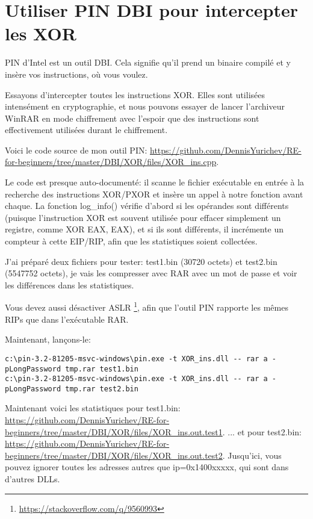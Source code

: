 \section{Utiliser PIN DBI pour intercepter les XOR}

\newcommand{\GitHubPinXORURL}{https://github.com/DennisYurichev/RE-for-beginners/tree/master/DBI/XOR/files}

PIN d'Intel est un outil \ac{DBI}.
Cela signifie qu'il prend un binaire compilé et y insère vos instructions, où vous
voulez.

Essayons d'intercepter toutes les instructions XOR.
Elles sont utilisées intensément en cryptographie, et nous pouvons essayer de lancer l'archiveur
WinRAR en mode chiffrement avec l'espoir que des instructions sont effectivement utilisées durant
le chiffrement.

Voici le code source de mon outil PIN: \url{\GitHubPinXORURL/XOR_ins.cpp}.

Le code est presque auto-documenté: il scanne le fichier exécutable en entrée à la recherche
des instructions XOR/PXOR et insère un appel à notre fonction avant chaque.
La fonction log\_info() vérifie d'abord si les opérandes sont différents (puisque
l'instruction XOR est souvent utilisée pour effacer simplement un registre, comme
XOR EAX, EAX), et si ils sont différents, il incrémente un compteur à cette EIP/RIP,
afin que les statistiques soient collectées.

J'ai préparé deux fichiers pour tester: test1.bin (30720 octets) et test2.bin (5547752 octets),
je vais les compresser avec RAR avec un mot de passe et voir les différences dans
les statistiques.

Vous devez aussi désactiver \ac{ASLR}
\footnote{\url{https://stackoverflow.com/q/9560993}},
afin que l'outil PIN rapporte les mêmes RIPs que dans l'exécutable RAR.

Maintenant, lançons-le:

\begin{lstlisting}
c:\pin-3.2-81205-msvc-windows\pin.exe -t XOR_ins.dll -- rar a -pLongPassword tmp.rar test1.bin
c:\pin-3.2-81205-msvc-windows\pin.exe -t XOR_ins.dll -- rar a -pLongPassword tmp.rar test2.bin
\end{lstlisting}

Maintenant voici les statistiques pour test1.bin: \\
\url{\GitHubPinXORURL/XOR_ins.out.test1}.
... et pour test2.bin: \\
\url{\GitHubPinXORURL/XOR_ins.out.test2}.
Jusqu'ici, vous pouvez ignorer toutes les adresses autres que ip=0x1400xxxxx, qui
sont dans d'autres DLLs.


